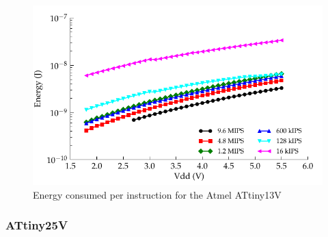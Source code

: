 \begin{figure}
\begin{centering}
\includegraphics{content/appendices/microprocessorPowerMeasurements/graphics/Graph_ATtiny13V_Clock_JPI}
\par\end{centering}

\protect\caption{
\label{fig:ATtiny13VClkJPI}Energy consumed per instruction for the
Atmel ATtiny13V
}


\end{figure}



\subsubsection*{ATtiny25V}

